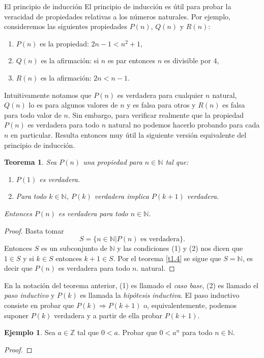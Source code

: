 \documentclass[11pt,spanish,makeidx]{amsbook}
\newtheorem{teorema}{Teorema}[section]
\theoremstyle{definition}
\newtheorem{ejemplo}{Ejemplo}[section]
\theoremstyle{remark}
\begin{document}
\begin{section}{El principio de inducción}
El principio de inducción es útil para probar la veracidad de propiedades relativas a los números naturales. Por ejemplo, consideremos las siguientes propiedades $P(n)$, $Q(n)$ y $R(n)$:
\begin{enumerate}
\item $P(n)$ es la propiedad: $2n -1 < n^2 + 1$,
\item $Q(n)$ es la afirmación: si $n$ es par entonces $n$ es divisible por 4,
\item $R(n)$ es la afirmación: $2n < n- 1$.
\end{enumerate}
Intuitivamente notamos que $P(n)$ es verdadera para cualquier $n$ natural, $Q(n)$ lo es para algunos valores de $n$ y es falsa para otros y $R(n)$ es falsa para todo valor de $n$. Sin embargo, para verificar realmente que la propiedad $P(n)$ es verdadera para todo $n$ natural no podemos hacerlo probando para cada $n$ en particular. Resulta entonces muy útil la siguiente versión equivalente del principio de inducción.
\begin{teorema}\label{induccion2} Sea $P(n)$ una propiedad para $n \in \mathbb N$ tal que:
\begin{enumerate}
\item[(1)] $P(1)$ es verdadera.
\item[(2)] Para todo $k \in \mathbb N$, $P(k)$ verdadera implica $P(k + 1)$ verdadera.
\end{enumerate}
Entonces $P(n)$ es verdadera para todo $n \in \mathbb N$.
\end{teorema}
\begin{proof} Basta tomar
$$S = \{n \in \mathbb N| P(n) \text{ es verdadera} \}.$$
Entonces $S$ es un subconjunto de $\mathbb N$ y las condiciones (1) y (2) nos dicen que $1 \in S$ y  si $ k \in S$ entonces $k+1\in S$. Por el teorema \ref{t1.4} se sigue que $S= \mathbb N$, es decir que $P(n)$ es verdadera para todo $n$. natural.
\end{proof}

En la notación del teorema anterior, (1) es llamado  el {\em caso base}, (2) es llamado el  {\em paso inductivo} y $P(k)$ es llamada la {\em hipótesis inductiva}. El paso inductivo  consiste en probar que $P(k) \Rightarrow P(k + 1)$ o, equivalentemente, podemos suponer $P(k)$ verdadera y a partir de ella probar $P(k + 1)$. 

\begin{ejemplo}\label{ejemplo141} Sea $a\in \mathbb Z$ tal que $0<a$. Probar que $0<a^n$ para todo $n \in \mathbb N$.
\end{ejemplo}
\begin{proof}


\end{proof}
\end{section}
\end{document}
